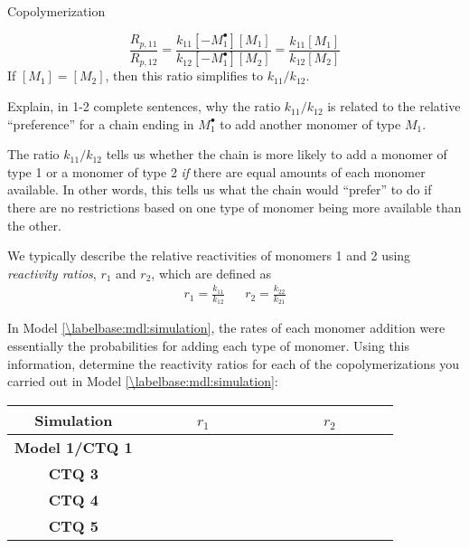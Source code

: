 \begin{activity}{Copolymerization}
\begin{ctqs}
		\begin{solution}[1in]{}
		
			\begin{equation*}
				\frac{R_{p,11}}{R_{p,12}} = \frac{k_{11}[-M_1^\bullet][M_1]}{k_{12}[-M_1^\bullet][M_2]} = \frac{k_{11}[M_1]}{k_{12}[M_2]}
			\end{equation*}
			If $[M_1]=[M_2]$, then this ratio simplifies to $k_{11}/k_{12}$.
		\end{solution}
	
	\question Explain, in 1-2 complete sentences, why the ratio $k_{11}/k_{12}$ is related to the relative ``preference'' for a chain ending in $M_1^\bullet$ to add another monomer of type $M_1$.
	
		\begin{solution}[1.5in]{}
			The ratio $k_{11}/k_{12}$ tells us whether the chain is more likely to add a monomer of type 1 or a monomer of type 2 \emph{if} there are equal amounts of each monomer available.  In other words, this tells us what the chain would ``prefer'' to do if there are no restrictions based on one type of monomer being more available than the other.
		\end{solution}
	
\end{ctqs}

\begin{infobox}

	We typically  describe the relative reactivities of monomers 1 and 2 using \emph{reactivity ratios}, $r_1$ and $r_2$, which are defined as
	\begin{align*}
		r_1 = \frac{k_{11}}{k_{12}} && r_2 = \frac{k_{22}}{k_{21}}
	\end{align*}

\end{infobox}

\begin{ctqs}

	\question In Model \ref{\labelbase:mdl:simulation}, the rates of each monomer addition were essentially the probabilities for adding each type of monomer.  Using this information, determine the reactivity ratios for each of the copolymerizations you carried out in Model \ref{\labelbase:mdl:simulation}:
	
		\begin{center}
		\renewcommand{\arraystretch}{2.5}
		\begin{tabular}{|c|c|c|}
			\hline
			\textbf{Simulation} & ~~~~~~$r_1$~~~~~~ & ~~~~~~$r_2$~~~~~~ \\\hline
			\textbf{Model 1/CTQ 1} & \answer{$\frac{0.5}{0.5}=1$} & \answer{$\frac{0.5}{0.5}=1$} \\\hline
			\textbf{CTQ 3} & \answer{$\frac{0.2}{0.8}=0.25$} & \answer{$\frac{0.2}{0.8}=0.25$} \\\hline
			\textbf{CTQ 4} & \answer{$\frac{0.8}{0.2}=4$} & \answer{$\frac{0.8}{0.2}=4$} \\\hline
			\textbf{CTQ 5} & \answer{$\frac{0.2}{0.8}=0.25$} & \answer{$\frac{0.8}{0.2}=4$} \\\hline
		\end{tabular}
		\end{center}


\end{ctqs}
\end{activity}
